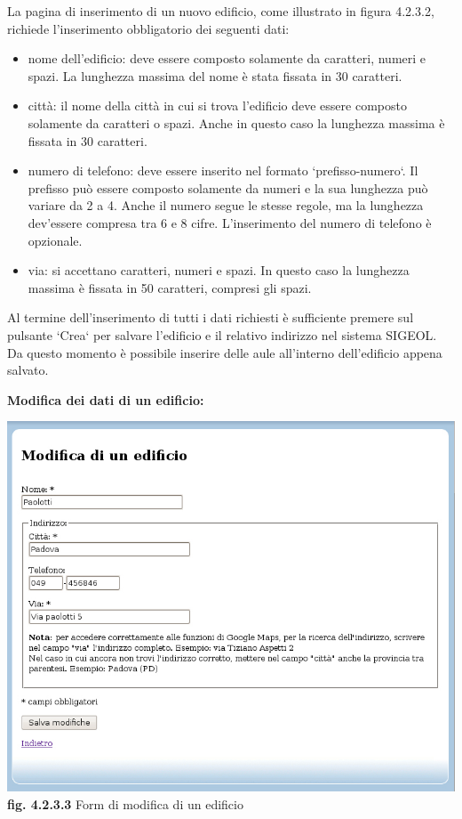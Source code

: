 \documentclass[11pt,a4paper]{article}
\begin{document}
La pagina di inserimento di un nuovo edificio, come illustrato in figura 4.2.3.2, richiede l'inserimento obbligatorio dei seguenti dati:
\begin{itemize}
 \item nome dell'edificio: deve essere composto solamente da caratteri, numeri e spazi. La lunghezza massima del nome è stata fissata in 30 caratteri.
 \item città: il nome della città in cui si trova l'edificio deve essere composto solamente da caratteri o spazi. Anche in questo caso la lunghezza massima è fissata in 30 caratteri.
 \item numero di telefono: deve essere inserito nel formato `prefisso-numero`. Il prefisso può essere composto solamente da numeri e la sua lunghezza può variare da 2 a 4. Anche il numero segue le stesse regole, ma la lunghezza dev'essere compresa tra 6 e 8 cifre. L'inserimento del numero di telefono è opzionale.
 \item via: si accettano caratteri, numeri e spazi. In questo caso la lunghezza massima è fissata in 50 caratteri, compresi gli spazi.
\end{itemize}
Al termine dell'inserimento di tutti i dati richiesti è sufficiente premere sul pulsante `Crea` per salvare l'edificio e il relativo indirizzo nel sistema SIGEOL.
Da questo momento è possibile inserire delle aule all'interno dell'edificio appena salvato.
\newline \newline \newline
\begin{large}\textbf{Modifica dei dati di un edificio:}\end{large}
\bigskip
\begin{center}
	\includegraphics[scale=0.5]{images/modifica_edificio.jpg}\\
	\textbf{fig. 4.2.3.3} Form di modifica di un edificio\\
\end{center}
\bigskip
\end{document}
